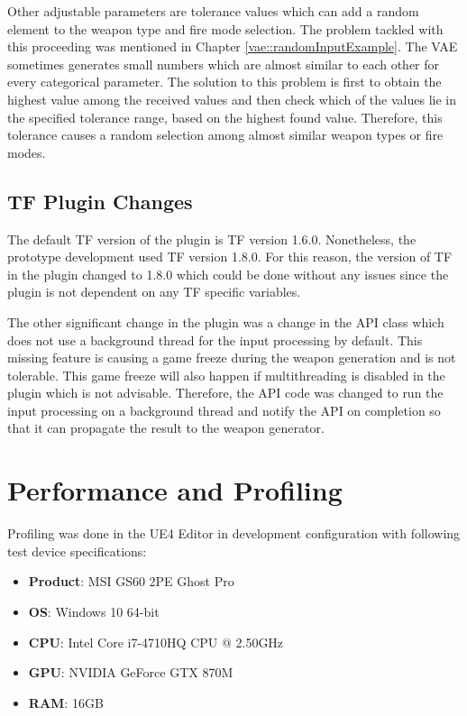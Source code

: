 \documentclass[MGS,Master,english]{twbook}%
\begin{document}
Other adjustable parameters are tolerance values which can add a random element to the weapon type and fire mode selection. The problem tackled with this proceeding was mentioned in Chapter \ref{vae::randomInputExample}. The VAE sometimes generates small numbers which are almost similar to each other for every categorical parameter. The solution to this problem is first to obtain the highest value among the received values and then check which of the values lie in the specified tolerance range, based on the highest found value. Therefore, this tolerance causes a random selection among almost similar weapon types or fire modes.

\subsection{\acl{TF} Plugin Changes}
The default TF version of the plugin is TF version 1.6.0. Nonetheless, the prototype development used TF version 1.8.0. For this reason, the version of TF in the plugin changed to 1.8.0 which could be done without any issues since the plugin is not dependent on any TF specific variables.

The other significant change in the plugin was a change in the API class which does not use a background thread for the input processing by default. This missing feature is causing a game freeze during the weapon generation and is not tolerable. This game freeze will also happen if multithreading is disabled in the plugin which is not advisable. Therefore, the API code was changed to run the input processing on a background thread and notify the API on completion so that it can propagate the result to the weapon generator.

\section{Performance and Profiling}
Profiling was done in the UE4 Editor in development configuration with following test device specifications:
\begin{itemize}
	\item \textbf{Product}: MSI GS60 2PE Ghost Pro
	\item \textbf{OS}: Windows 10 64-bit
	\item \textbf{CPU}: Intel Core i7-4710HQ CPU @ 2.50GHz
	\item \textbf{GPU}: NVIDIA GeForce GTX 870M
	\item \textbf{\ac{RAM}}: 16GB
\end{itemize}
\end{document}
